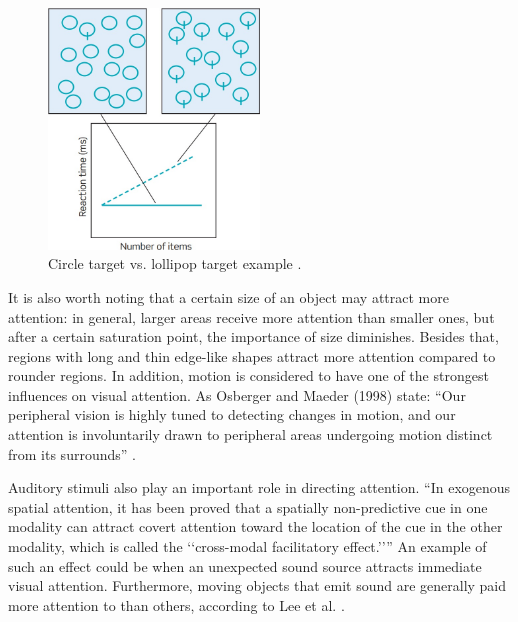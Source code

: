 \begin{figure}[h!]
	\centering
	\includegraphics[width=0.5\textwidth]{figures/circle_lollipop_example.jpg}
	\caption{Circle target vs. lollipop target example \cite{snowden2012basic}.}\label{fig:circle_lollipop_example}
\end{figure}

It is also worth noting that a certain size of an object may attract more attention: in general, larger areas receive more attention than smaller ones, but after a certain saturation point, the importance of size diminishes. Besides that, regions with long and thin edge-like shapes attract more attention compared to rounder regions. In addition, motion is considered to have one of the strongest influences on visual attention. As Osberger and Maeder (1998) state: “Our peripheral vision is highly tuned to detecting changes in motion, and our attention is involuntarily drawn to peripheral areas undergoing motion distinct from its surrounds” \cite{osberger1998automatic}. 

Auditory stimuli also play an important role in directing attention. “In exogenous spatial attention, it has been proved that a spatially non-predictive cue in one modality can attract covert attention toward the location of the cue in the other modality, which is called the ‘‘cross-modal facilitatory effect.’’”  An example of such an effect could be when an unexpected sound source attracts immediate visual attention. Furthermore, moving objects that emit sound are generally paid more attention to than others, according to Lee et al. \cite{lee2011efficient}.

